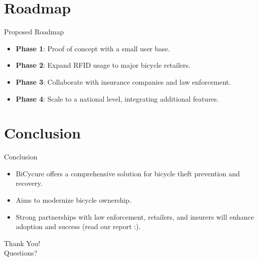 \documentclass{beamer}
\begin{document}
\section{Roadmap}
\begin{frame}{Proposed Roadmap}
    \begin{itemize}
        \item \textbf{Phase 1}: Proof of concept with a small user base.
        \item \textbf{Phase 2}: Expand RFID usage to major bicycle retailers.
        \item \textbf{Phase 3}: Collaborate with insurance companies and law enforcement.
        \item \textbf{Phase 4}: Scale to a national level, integrating additional features.
    \end{itemize}
\end{frame}


\section{Conclusion}
\begin{frame}{Conclusion}
    \begin{itemize}
        \item BiCycure offers a comprehensive solution for bicycle theft prevention and recovery.
        \item Aims to modernize bicycle ownership.
        \item Strong partnerships with law enforcement, retailers, and insurers will enhance adoption and success (read our report :).
    \end{itemize}
\end{frame}

\begin{frame}
    \centering
    \Huge Thank You! \\
    \normalsize Questions?
\end{frame}
\end{document}
